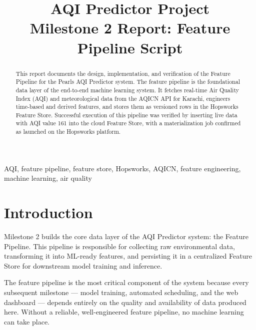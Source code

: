 \documentclass[conference]{IEEEtran}
\begin{document}
\title{AQI Predictor Project\\
{\large Milestone 2 Report: Feature Pipeline Script}}

\author{
}

\maketitle

\begin{abstract}
This report documents the design, implementation, and verification of the Feature Pipeline for the Pearls AQI Predictor system. The feature pipeline is the foundational data layer of the end-to-end machine learning system. It fetches real-time Air Quality Index (AQI) and meteorological data from the AQICN API for Karachi, engineers time-based and derived features, and stores them as versioned rows in the Hopsworks Feature Store. Successful execution of this pipeline was verified by inserting live data with AQI value 161 into the cloud Feature Store, with a materialization job confirmed as launched on the Hopsworks platform.
\end{abstract}

\begin{IEEEkeywords}
AQI, feature pipeline, feature store, Hopsworks, AQICN, feature engineering, machine learning, air quality
\end{IEEEkeywords}

\section{Introduction}

Milestone 2 builds the core data layer of the AQI Predictor system: the Feature Pipeline. This pipeline is responsible for collecting raw environmental data, transforming it into ML-ready features, and persisting it in a centralized Feature Store for downstream model training and inference.

The feature pipeline is the most critical component of the system because every subsequent milestone — model training, automated scheduling, and the web dashboard — depends entirely on the quality and availability of data produced here. Without a reliable, well-engineered feature pipeline, no machine learning can take place.
\end{document}
